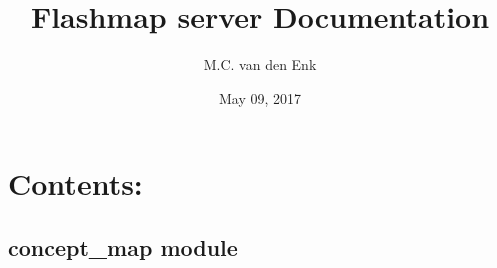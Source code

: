 \documentclass[letterpaper,10pt,english]{sphinxmanual}
\title{Flashmap server Documentation}
\date{May 09, 2017}
\author{M.C. van den Enk}
\begin{document}
\maketitle
\sphinxtableofcontents
{}\label{\detokenize{index::doc}}


\noindent{}


\chapter{Contents:}
\label{\detokenize{index:contents}}\label{\detokenize{index:class-diagram}}

\section{concept\_map module}
\label{\detokenize{concept_map:module-concept_map}}\label{\detokenize{concept_map::doc}}\label{\detokenize{concept_map:concept-map-module}}
\end{document}
